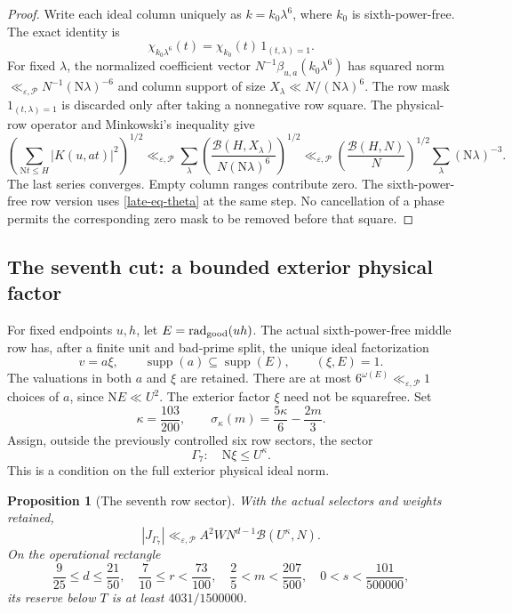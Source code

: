 \documentclass[11pt]{article}
\newtheorem{proposition}[theorem]{Proposition}
\theoremstyle{definition}
\newcommand{\N}{\mathrm N}
\newcommand{\eps}{\varepsilon}
\newcommand{\lls}{\ll_{\eps,\mathcal P}}
\begin{document}
\begin{proof}
Write each ideal column uniquely as $k=k_0\lambda^6$, where $k_0$ is
sixth-power-free.  The exact identity is
\[
 \chi_{k_0\lambda^6}(t)
   =\chi_{k_0}(t)\,1_{(t,\lambda)=1}.
\]
For fixed $\lambda$, the normalized coefficient vector
$N^{-1}\beta_{u,a}(k_0\lambda^6)$ has squared norm
$\lls N^{-1}(\N\lambda)^{-6}$ and column support of size
$X_\lambda\ll N/(\N\lambda)^6$.  The row mask
$1_{(t,\lambda)=1}$ is discarded only after taking a nonnegative row
square.  The physical-row operator and Minkowski's inequality give
\[
 \left(\sum_{\N t\le H}|K(u,at)|^2\right)^{1/2}
 \lls
 \sum_\lambda
  \left(\frac{\mathcal B(H,X_\lambda)}
                   {N(\N\lambda)^6}\right)^{1/2}
 \lls \left(\frac{\mathcal B(H,N)}N\right)^{1/2}
                  \sum_\lambda(\N\lambda)^{-3}.
\]
The last series converges.  Empty column ranges contribute zero.  The
sixth-power-free row version uses \eqref{late-eq-theta} at the same
step.  No cancellation of a phase permits the corresponding zero
mask to be removed before that square.
\end{proof}

\subsection{The seventh cut: a bounded exterior physical factor}
\label{late-subsec-seventh}

For fixed endpoints $u,h$, let $E=\operatorname{rad}_{\rm good}(uh)$.
The actual sixth-power-free middle row has, after a finite unit and
bad-prime split, the unique ideal factorization
\[
 v=a\xi,\qquad \operatorname{supp}(a)\subseteq\operatorname{supp}(E),
 \qquad (\xi,E)=1.
\]
The valuations in both $a$ and $\xi$ are retained.  There are at most
$6^{\omega(E)}\lls1$ choices of $a$, since $\N E\ll U^2$.
The exterior factor $\xi$ need not be squarefree.  Set
\begin{equation}
 \kappa=\frac{103}{200},\qquad
 \sigma_\kappa(m)=\frac{5\kappa}{6}-\frac{2m}{3}.
 \label{late-eq-kappa}
\end{equation}
Assign, outside the previously controlled six row sectors, the sector
\begin{equation}
 \Gamma_7:\quad \N\xi\le U^\kappa.
 \label{late-eq-gamma7}
\end{equation}
This is a condition on the full exterior physical ideal norm.

\begin{proposition}[The seventh row sector]
\label{late-prop-seventh}
With the actual selectors and weights retained,
\begin{equation}
 |J_{\Gamma_7}|\lls A^2W N^{d-1}\mathcal B(U^\kappa,N).
 \label{late-eq-seventh-bound}
\end{equation}
On the operational rectangle
\begin{equation}
 \frac9{25}\le d\le\frac{21}{50},\quad
 \frac7{10}\le r<\frac{73}{100},\quad
 \frac25<m<\frac{207}{500},\quad
 0<s<\frac{101}{500000},
 \label{late-eq-rectangle}
\end{equation}
its reserve below $T$ is at least $4031/1500000$.
\end{proposition}
\end{document}
